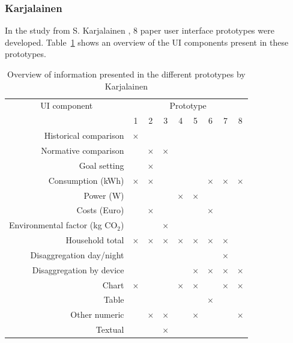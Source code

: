 \documentclass[journal]{vgtc}                %
\begin{document}
\subsubsection{Karjalainen}
In the study from S. Karjalainen \cite{karjalainen2011consumer}, 8 paper user interface prototypes were developed. Table~\ref{prototypes} shows an overview of the UI components present in these prototypes.

\begin{table}[h]
  \caption{Overview of information presented in the different prototypes by Karjalainen \cite{karjalainen2011consumer}}
  \label{prototypes}
  \scriptsize
  \begin{center}
    \begin{tabular}{r|cccccccc}
    
      \multicolumn{1}{c|}{UI component} & \multicolumn{8}{c}{Prototype} \\
    
       & 1 & 2 & 3 & 4 & 5 & 6 & 7 & 8 \\
    \hline
      Historical comparison & $\times$ &  &  &  &  &  &  & \\ \hline
      Normative comparison &  & $\times$ & $\times$ &  &  &  &  & \\ \hline
      Goal setting &  & $\times$ &  &  &  &  &  & \\ \hline
      Consumption (kWh) & $\times$ & $\times$ &  &  &  & $\times$ & $\times$ & $\times$ \\ \hline
      Power (W) &  &  &  & $\times$ & $\times$ &  &  & \\ \hline
      Costs (Euro) &  & $\times$ &  &  &  & $\times$ &  & \\ \hline
      Environmental factor (kg CO$_2$) &  &  & $\times$ &  &  &  &  & \\ \hline
      Household total & $\times$ & $\times$ & $\times$ & $\times$ & $\times$ & $\times$ & $\times$ & \\ \hline
      Disaggregation day/night &  &  &  &  &  &  & $\times$ & \\ \hline
      Disaggregation by device &  &  &  &  & $\times$ & $\times$ & $\times$ & $\times$ \\ \hline
      Chart & $\times$ &  &  & $\times$ & $\times$ &  & $\times$ & $\times$ \\ \hline
      Table &  &  &  &  &  & $\times$ &  & \\ \hline
      Other numeric &  & $\times$ & $\times$ &  & $\times$ &  &  & $\times$ \\ \hline
      Textual &  &  & $\times$ &  &  &  &  & \\ 
    \end{tabular}
  \end{center}
\end{table}
\end{document}
